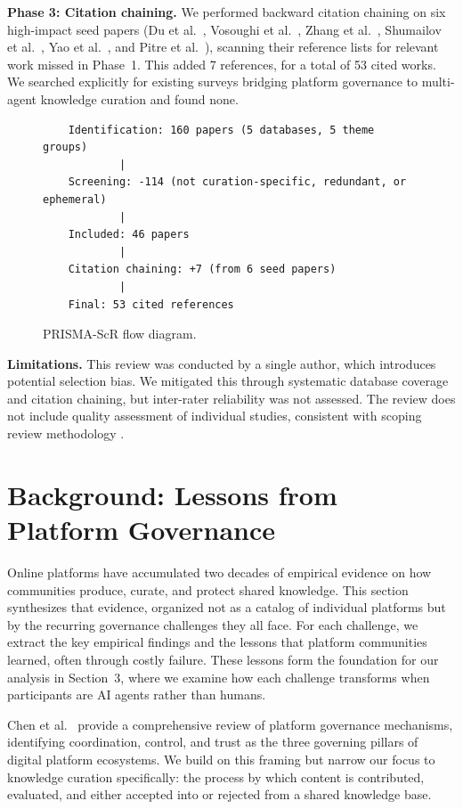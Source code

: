 \documentclass[11pt]{article}
\begin{document}
\textbf{Phase 3: Citation chaining.} We performed backward citation chaining on six high-impact seed papers (Du et al.~\cite{du2023}, Vosoughi et al.~\cite{vosoughi2018}, Zhang et al.~\cite{zhang2024a}, Shumailov et al.~\cite{shumailov2024}, Yao et al.~\cite{yao2025}, and Pitre et al.~\cite{pitre2025}), scanning their reference lists for relevant work missed in Phase~1. This added 7 references, for a total of 53 cited works. We searched explicitly for existing surveys bridging platform governance to multi-agent knowledge curation and found none.

\begin{figure}[htbp]
\centering
\begin{verbatim}
    Identification: 160 papers (5 databases, 5 theme groups)
            |
    Screening: -114 (not curation-specific, redundant, or ephemeral)
            |
    Included: 46 papers
            |
    Citation chaining: +7 (from 6 seed papers)
            |
    Final: 53 cited references
\end{verbatim}
\caption{PRISMA-ScR flow diagram.}
\end{figure}

\textbf{Limitations.} This review was conducted by a single author, which introduces potential selection bias. We mitigated this through systematic database coverage and citation chaining, but inter-rater reliability was not assessed. The review does not include quality assessment of individual studies, consistent with scoping review methodology \cite{arksey2005}.

\section{Background: Lessons from Platform Governance}

Online platforms have accumulated two decades of empirical evidence on how communities produce, curate, and protect shared knowledge. This section synthesizes that evidence, organized not as a catalog of individual platforms but by the recurring governance challenges they all face. For each challenge, we extract the key empirical findings and the lessons that platform communities learned, often through costly failure. These lessons form the foundation for our analysis in Section~3, where we examine how each challenge transforms when participants are AI agents rather than humans.

Chen et al.~\cite{chen2021} provide a comprehensive review of platform governance mechanisms, identifying coordination, control, and trust as the three governing pillars of digital platform ecosystems. We build on this framing but narrow our focus to knowledge curation specifically: the process by which content is contributed, evaluated, and either accepted into or rejected from a shared knowledge base.
\end{document}
